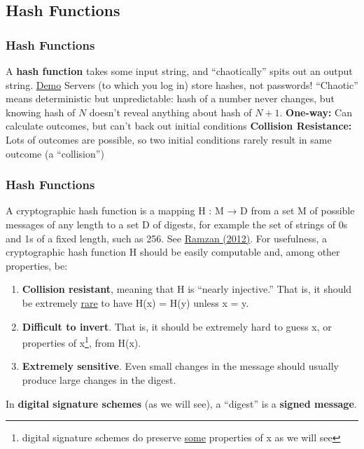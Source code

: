\documentclass[aspectratio=169]{beamer}
\begin{document}
\subsection{Hash Functions}

\begin{frame}
\frametitle{Hash Functions} 

\bi
\m A \textbf{hash function} takes some input string, and ``chaotically'' spits out an output string. \href{https://emn178.github.io/online-tools/sha256.html}{Demo}
\m Servers (to which you log in) store hashes, not passwords! \pause 
\m ``Chaotic'' means deterministic but unpredictable: hash of a number never changes, but knowing hash of $N$ doesn't reveal anything about hash of $N+1$. 
\bi
\m \textbf{One-way:} Can calculate outcomes, but can't back out initial conditions
\m \textbf{Collision Resistance:} Lots of outcomes are possible, so two initial conditions rarely result in same outcome (a ``collision'') 
\ei 
\ei

\end{frame}

\begin{frame}\frametitle{Hash Functions}

A cryptographic hash function is a mapping H : M → D from a set M of possible messages of any length to a set D of digests, for example the set of strings of 0s and 1s of a fixed length, such as 256. See \href{https://www.youtube.com/watch?v=0WiTaBI82Mc}{Ramzan (2012)}. 
\vfill \pause 
For usefulness, a cryptographic hash function H should be easily computable and, among other properties, be: 
\begin{enumerate}
    \item \textbf{Collision resistant}, meaning that H is “nearly injective.” That is, it should be extremely \ul{rare} to have H(x) = H(y) unless x = y.\pause 
    \item \textbf{Difficult to invert}. That is, it should be extremely hard to guess x, or properties of x\footnote{digital signature schemes do preserve \ul{some} properties of x as we will see}, from H(x).\pause 
    \item \textbf{Extremely sensitive}. Even small changes in the message should usually produce large changes in the digest.  \pause 
\end{enumerate}
In \textbf{digital signature schemes} (as we will see), a ``digest'' is a \textbf{signed message}. 
\end{frame}
\end{document}
